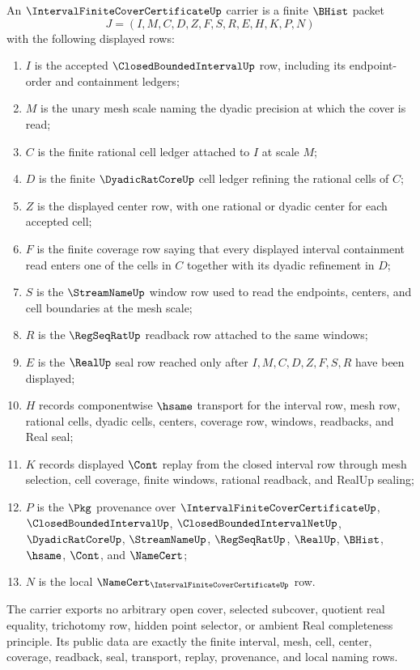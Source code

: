 \begin{definition}
\label{def:interval-finite-cover-certificate-carrier}
An $\IntervalFiniteCoverCertificateUp$ carrier is a finite $\BHist$ packet
$$
J=(I,M,C,D,Z,F,S,R,E,H,K,P,N)
$$
with the following displayed rows:
\begin{enumerate}
\item $I$ is the accepted $\ClosedBoundedIntervalUp$ row, including its endpoint-order and containment ledgers;
\item $M$ is the unary mesh scale naming the dyadic precision at which the cover is read;
\item $C$ is the finite rational cell ledger attached to $I$ at scale $M$;
\item $D$ is the finite $\DyadicRatCoreUp$ cell ledger refining the rational cells of $C$;
\item $Z$ is the displayed center row, with one rational or dyadic center for each accepted cell;
\item $F$ is the finite coverage row saying that every displayed interval containment read enters one of the cells in $C$ together with its dyadic refinement in $D$;
\item $S$ is the $\StreamNameUp$ window row used to read the endpoints, centers, and cell boundaries at the mesh scale;
\item $R$ is the $\RegSeqRatUp$ readback row attached to the same windows;
\item $E$ is the $\RealUp$ seal row reached only after $I,M,C,D,Z,F,S,R$ have been displayed;
\item $H$ records componentwise $\hsame$ transport for the interval row, mesh row, rational cells, dyadic cells, centers, coverage row, windows, readbacks, and Real seal;
\item $K$ records displayed $\Cont$ replay from the closed interval row through mesh selection, cell coverage, finite windows, rational readback, and RealUp sealing;
\item $P$ is the $\Pkg$ provenance over $\IntervalFiniteCoverCertificateUp$, $\ClosedBoundedIntervalUp$, $\ClosedBoundedIntervalNetUp$, $\DyadicRatCoreUp$, $\StreamNameUp$, $\RegSeqRatUp$, $\RealUp$, $\BHist$, $\hsame$, $\Cont$, and $\NameCert$;
\item $N$ is the local $\NameCert_{\IntervalFiniteCoverCertificateUp}$ row.
\end{enumerate}
The carrier exports no arbitrary open cover, selected subcover, quotient real equality, trichotomy row, hidden point selector, or ambient Real completeness principle. Its public data are exactly the finite interval, mesh, cell, center, coverage, readback, seal, transport, replay, provenance, and local naming rows.
\end{definition}

